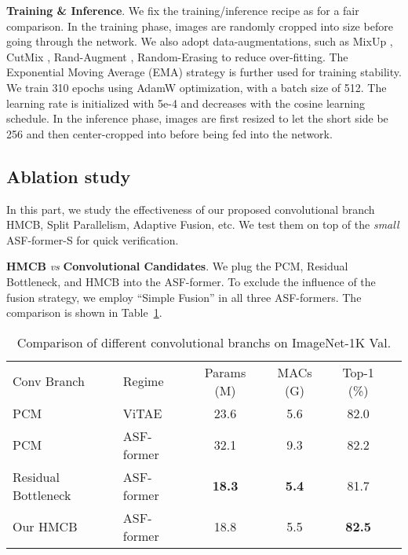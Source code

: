 \documentclass[lettersize,journal]{IEEEtran}
\begin{document}
\textbf{Training \& Inference}. We fix the training/inference recipe as \cite{yuan2021tokens} for a fair comparison. In the training phase, images are randomly cropped into size  before going through the network. We also adopt data-augmentations, such as MixUp \cite{zhang2018mixup}, CutMix \cite{yun2019cutmix}, Rand-Augment \cite{Cubuk2020RandaugmentPA}, Random-Erasing \cite{zhong2020random} to reduce over-fitting. The Exponential Moving Average (EMA) strategy is further used for training stability. We train 310 epochs using AdamW optimization, with a batch size of 512. The learning rate is initialized with 5e-4 and decreases with the cosine learning schedule. 
In the inference phase, images are first resized to let the short side be 256 and then center-cropped into  before being fed into the network.

\subsection{Ablation study}
\label{sec:abla}
In this part, we study the effectiveness of our proposed convolutional branch HMCB, Split Parallelism, Adaptive Fusion, etc. We test them on top of the \textit{small} ASF-former-S for quick verification. 

\textbf{HMCB} \textit{vs} \textbf{Convolutional Candidates}. We plug the PCM, Residual Bottleneck, and HMCB into the ASF-former. To exclude the influence of the fusion strategy, we employ ``Simple Fusion'' in all three ASF-formers. The comparison is shown in Table~\ref{table:convbranch}.
\setlength{\tabcolsep}{4pt}
\begin{table}[th]
\begin{center}
\caption{Comparison of different convolutional branchs on ImageNet-1K Val.}
\label{table:convbranch}
\begin{tabular}{llcccc}
\hline\noalign{\smallskip}
Conv Branch &Regime &Params (M)&MACs (G) &Top-1 (\%)\\
\noalign{\smallskip}
\hline
\noalign{\smallskip}
PCM &ViTAE \cite{Xu2021ViTAEVT}& 23.6 & 5.6 & 82.0 \\
PCM &ASF-former& 32.1 & 9.3 & 82.2 \\
Residual Bottleneck&ASF-former& \textbf{18.3} & \textbf{5.4} & 81.7\\
Our HMCB&ASF-former& 18.8 & 5.5 & \textbf{82.5} \\
\hline
\end{tabular}
\end{center}
\end{table}
\setlength{\tabcolsep}{1.4pt}
\end{document}
